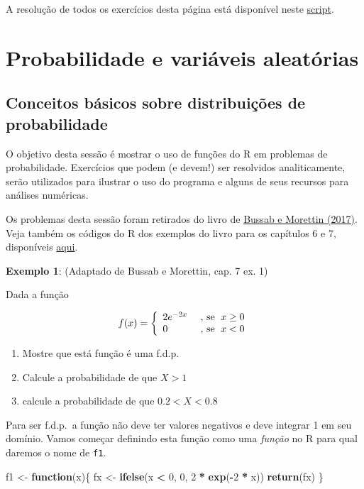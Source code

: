 \documentclass[10pt,a4paper]{book}
\newenvironment{Shaded}{\begin{snugshade}}{\end{snugshade}}
\newcommand{\KeywordTok}[1]{\textcolor[rgb]{0.13,0.29,0.53}{\textbf{#1}}}
\newcommand{\DecValTok}[1]{\textcolor[rgb]{0.00,0.00,0.81}{#1}}
\newcommand{\StringTok}[1]{\textcolor[rgb]{0.31,0.60,0.02}{#1}}
\newcommand{\ControlFlowTok}[1]{\textcolor[rgb]{0.13,0.29,0.53}{\textbf{#1}}}
\newcommand{\OperatorTok}[1]{\textcolor[rgb]{0.81,0.36,0.00}{\textbf{#1}}}
\newcommand{\NormalTok}[1]{#1}
\providecommand{\tightlist}{%
  \setlength{\itemsep}{0pt}\setlength{\parskip}{0pt}}
\begin{document}
A resolução de todos os exercícios desta página está disponível neste
\href{scripts/analise-exploratoria-exercicios.R}{script}.

\chapter{Probabilidade e variáveis
aleatórias}\label{probabilidade-e-variaveis-aleatorias}

\section{Conceitos básicos sobre distribuições de
probabilidade}\label{conceitos-basicos-sobre-distribuicoes-de-probabilidade}

O objetivo desta sessão é mostrar o uso de funções do R em problemas de
probabilidade. Exercícios que podem (e devem!) ser resolvidos
analiticamente, serão utilizados para ilustrar o uso do programa e
alguns de seus recursos para análises numéricas.

Os problemas desta sessão foram retirados do livro de
\href{https://www.ime.usp.br/~pam/EstBas.html}{Bussab e Morettin
(2017)}. Veja também os códigos do R dos exemplos do livro para os
capítulos 6 e 7, disponíveis
\href{https://rpubs.com/EstatBasica/Introd}{aqui}.

\textbf{Exemplo 1}: (Adaptado de Bussab e Morettin, cap. 7 ex. 1)

Dada a função

\[
\
  f(x) = \left\{ \begin{array}{ll}
      2 e^{-2x} & \mbox{ , se $ \; x \geq 0$} \cr
      0   & \mbox{ , se  $ \; x < 0$}
    \end{array} \right.
\
\]

\begin{enumerate}
\def\labelenumi{\alph{enumi}.}
\tightlist
\item
  Mostre que está função é uma f.d.p.
\item
  Calcule a probabilidade de que \(X > 1\)
\item
  calcule a probabilidade de que \(0.2 < X < 0.8\)
\end{enumerate}

Para ser f.d.p.~a função não deve ter valores negativos e deve integrar
1 em seu domínio. Vamos começar definindo esta função como uma
\emph{função} no R para qual daremos o nome de \texttt{f1}.

\begin{Shaded}
\begin{Highlighting}[]
\NormalTok{f1 <-}\StringTok{ }\ControlFlowTok{function}\NormalTok{(x)\{}
\NormalTok{    fx <-}\StringTok{ }\KeywordTok{ifelse}\NormalTok{(x }\OperatorTok{<}\StringTok{ }\DecValTok{0}\NormalTok{, }\DecValTok{0}\NormalTok{, }\DecValTok{2} \OperatorTok{*}\StringTok{ }\KeywordTok{exp}\NormalTok{(}\OperatorTok{-}\DecValTok{2} \OperatorTok{*}\StringTok{ }\NormalTok{x))}
    \KeywordTok{return}\NormalTok{(fx)}
\NormalTok{\}}
\end{Highlighting}
\end{Shaded}
\end{document}

